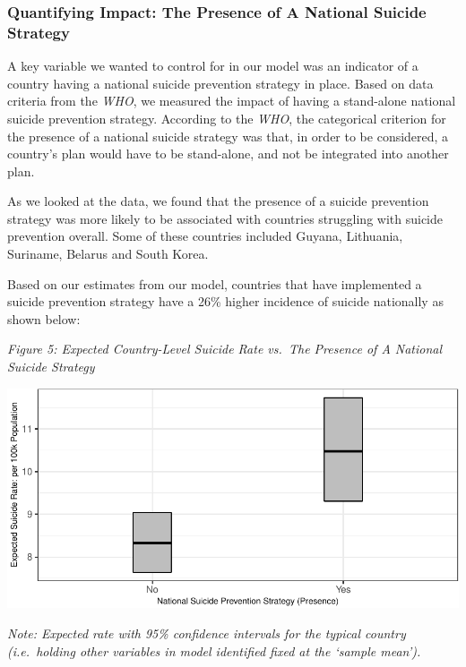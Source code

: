\documentclass[]{article}
\begin{document}
\subsubsection{Quantifying Impact: The Presence of A National Suicide
Strategy}\label{quantifying-impact-the-presence-of-a-national-suicide-strategy}

A key variable we wanted to control for in our model was an indicator of
a country having a national suicide prevention strategy in place. Based
on data criteria from the \emph{WHO}, we measured the impact of having a
stand-alone national suicide prevention strategy. According to the
\emph{WHO}, the categorical criterion for the presence of a national
suicide strategy was that, in order to be considered, a country's plan
would have to be stand-alone, and not be integrated into another plan.

As we looked at the data, we found that the presence of a suicide
prevention strategy was more likely to be associated with countries
struggling with suicide prevention overall. Some of these countries
included Guyana, Lithuania, Suriname, Belarus and South Korea.

Based on our estimates from our model, countries that have implemented a
suicide prevention strategy have a 26\% higher incidence of suicide
nationally as shown below:

\newpage 

\emph{Figure 5: Expected Country-Level Suicide Rate vs.~The Presence of
A National Suicide Strategy}

\begin{center}\includegraphics{Project_Report_files/figure-latex/sstrat_plot-1} \end{center}

\emph{Note: Expected rate with 95\% confidence intervals for the typical
country (i.e.~holding other variables in model identified fixed at the
`sample mean').}
\end{document}
